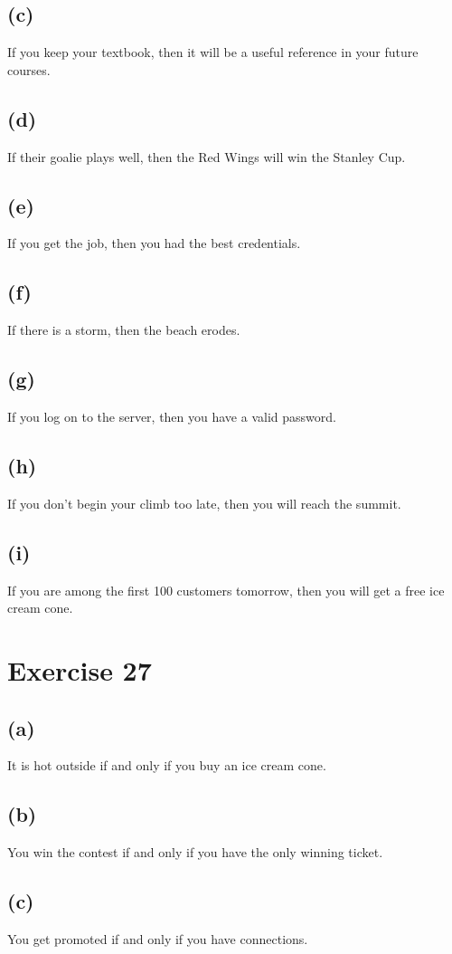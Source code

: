 \documentclass{article}
\begin{document}
\subsection{(c)}
If you keep your textbook, then it will be a useful reference in your future courses.
\subsection{(d)}
If their goalie plays well, then the Red Wings will win the Stanley Cup.
\subsection{(e)}
If you get the job, then you had the best credentials.
\subsection{(f)}
If there is a storm, then the beach erodes.
\subsection{(g)}
If you log on to the server, then you have a valid password.
\subsection{(h)}
If you don't begin your climb too late, then you will reach the summit.
\subsection{(i)}
If you are among the first 100 customers tomorrow, then you will get a free ice cream cone.

\pagebreak

\section{Exercise 27}
\subsection{(a)}
It is hot outside if and only if you buy an ice cream cone.
\subsection{(b)}
You win the contest if and only if you have the only winning ticket.
\subsection{(c)}
You get promoted if and only if you have connections.
\end{document}
